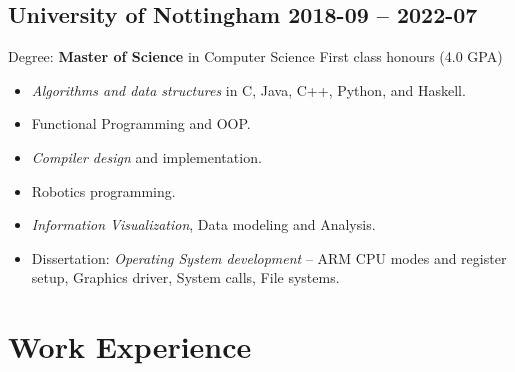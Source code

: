 \subsection{University of Nottingham \hfill 2018-09 -- 2022-07}
Degree: \textbf{Master of Science} in Computer Science
        \hfill
        First class honours (4.0 GPA)
        \begin{itemize}
            \item \emph{Algorithms and data structures} in C, Java, C++,
                Python, and Haskell.
            \item Functional Programming and OOP.
            \item \emph{Compiler design} and implementation.
            \item Robotics programming.
            \item \emph{Information Visualization}, Data modeling and Analysis.
            \item Dissertation: \emph{Operating System development} --
                    ARM CPU modes and register setup,
                    Graphics driver,
                    System calls,
                    File systems.
        \end{itemize}

\section{Work Experience}
